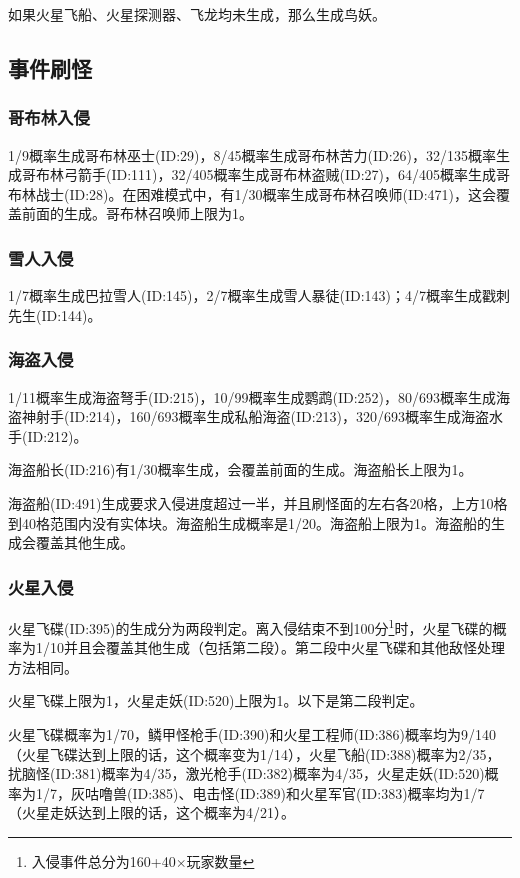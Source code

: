 如果火星飞船、火星探测器、飞龙均未生成，那么生成鸟妖。

\subsection{事件刷怪}
\subsubsection{哥布林入侵}
1/9概率生成哥布林巫士(ID:29)，8/45概率生成哥布林苦力(ID:26)，32/135概率生成哥布林弓箭手(ID:111)，32/405概率生成哥布林盗贼(ID:27)，64/405概率生成哥布林战士(ID:28)。在困难模式中，有1/30概率生成哥布林召唤师(ID:471)，这会覆盖前面的生成。哥布林召唤师上限为1。

\subsubsection{雪人入侵}
1/7概率生成巴拉雪人(ID:145)，2/7概率生成雪人暴徒(ID:143)；4/7概率生成戳刺先生(ID:144)。

\subsubsection{海盗入侵}
1/11概率生成海盗弩手(ID:215)，10/99概率生成鹦鹉(ID:252)，80/693概率生成海盗神射手(ID:214)，160/693概率生成私船海盗(ID:213)，320/693概率生成海盗水手(ID:212)。

海盗船长(ID:216)有1/30概率生成，会覆盖前面的生成。海盗船长上限为1。

海盗船(ID:491)生成要求入侵进度超过一半，并且刷怪面的左右各20格，上方10格到40格范围内没有实体块。海盗船生成概率是1/20。海盗船上限为1。海盗船的生成会覆盖其他生成。

\subsubsection{火星入侵}
火星飞碟(ID:395)的生成分为两段判定。离入侵结束不到100分\footnote{入侵事件总分为160+40$\times$玩家数量}时，火星飞碟的概率为1/10并且会覆盖其他生成（包括第二段）。第二段中火星飞碟和其他敌怪处理方法相同。

火星飞碟上限为1，火星走妖(ID:520)上限为1。以下是第二段判定。

火星飞碟概率为1/70，鳞甲怪枪手(ID:390)和火星工程师(ID:386)概率均为9/140（火星飞碟达到上限的话，这个概率变为1/14），火星飞船(ID:388)概率为2/35，扰脑怪(ID:381)概率为4/35，激光枪手(ID:382)概率为4/35，火星走妖(ID:520)概率为1/7，灰咕噜兽(ID:385)、电击怪(ID:389)和火星军官(ID:383)概率均为1/7（火星走妖达到上限的话，这个概率为4/21）。
